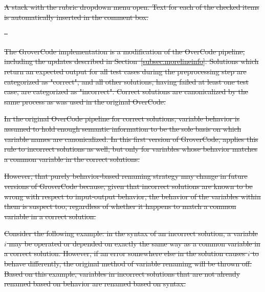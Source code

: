 \documentclass[12pt,twoside]{mitthesis}
\providecommand{\DIFdeltex}[1]{{\protect\color{red}\sout{#1}}}                      %
\providecommand{\DIFdelFL}[1]{\DIFdel{#1}} %
\providecommand{\DIFdel}[1]{\texorpdfstring{\DIFdeltex{#1}}{}} %
\begin{document}
{{{{{{{{{{%
{%
\DIFdelFL{A stack with the rubric dropdown menu open. Text for each of the checked items is automatically inserted in the comment box.}}

\DIFdel{~}%

\DIFdel{The GroverCode implementation is a modification of the OverCode pipeline, including the updates described in Section~\ref{subsec:morelineinfo}. Solutions which return an expected output for all test cases during the preprocessing step are categorized as "correct", and all other solutions, having failed at least one test case, are categorized as "incorrect". Correct solutions are canonicalized by the same process as was used in the original OverCode. 
}%

\DIFdel{In the original OverCode pipeline for correct solutions, variable behavior is assumed to hold enough semantic information to be the sole basis on which variable names are canonicalized. In this first version of GroverCode, applies this rule to incorrect solutions as well, but only for variables whose behavior matches a common variable in the correct solutions. %
}%

\DIFdel{However, that purely behavior-based renaming strategy may change in future versions of GroverCode because, given that incorrect solutions are known to be wrong with respect to input-output behavior, the behavior of the variables within them is suspect too, regardless of whether it happens to match a common variable in a correct solution.
}%

\DIFdel{Consider the following example: in the syntax of an incorrect solution, a variable $i$ may be operated or depended on exactly the same way as a common variable in a correct solution. However, if an error somewhere else in the solution causes $i$ to behave differently, the original method of variable renaming will be thrown off. Based on this example, variables in incorrect solutions that are not already renamed based on behavior are renamed based on syntax.
}%

}}}}}}}}}}
\end{document}
